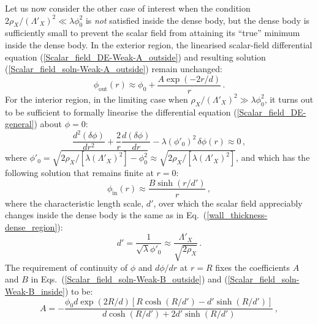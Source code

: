 \documentclass[aps,prd,onecolumn,nofootinbib]{revtex4-2} %
\begin{document}
Let us now consider the other case of interest when the condition $2 \rho_X / (\Lambda'_X)^2 \ll \lambda \phi_0^2$ is \textit{not} satisfied inside the dense body, but the dense body is sufficiently small to prevent the scalar field from attaining its ``true'' minimum inside the dense body. 
In the exterior region, the linearised scalar-field differential equation (\ref{Scalar_field_DE-Weak-A_outside}) and resulting solution (\ref{Scalar_field_soln-Weak-A_outside}) remain unchanged: 
\begin{equation}
\label{Scalar_field_soln-Weak-B_outside}
\phi_\textrm{out} (r) \approx \phi_0 + \frac{A \exp \left( -2r / d \right)}{r}  \, . 
\end{equation}
For the interior region, in the limiting case when $ \rho_X / (\Lambda'_X)^2 \gg \lambda \phi_0^2$, it turns out to be sufficient to formally linearise the differential equation (\ref{Scalar_field_DE-general}) about $\phi = 0$: 
\begin{equation}
\label{Scalar_field_DE-Weak-B_inside}
\frac{d^2 (\delta \phi)}{d r^2} + \frac{2}{r} \frac{d (\delta \phi)}{d r} - \lambda (\phi'_0)^2 \, \delta \phi (r) \approx 0  \, , 
\end{equation}
where $\phi'_0 = \sqrt{ 2 \rho_X / [\lambda ( \Lambda'_X )^2] - \phi_0^2} \approx \sqrt{ 2 \rho_X / [\lambda ( \Lambda'_X )^2]} $, and which has the following solution that remains finite at $r = 0$: 
\begin{equation}
\label{Scalar_field_soln-Weak-B_inside}
\phi_\textrm{in} (r) \approx \frac{B \sinh \left( r / d' \right)}{r}  \, , 
\end{equation}
where the characteristic length scale, $d'$, over which the scalar field appreciably changes inside the dense body is the same as in Eq.~(\ref{wall_thickness-dense_region}): 
\begin{equation}
\label{char_length_scale-Weak-B_inside}
d' = \frac{1}{\sqrt{\lambda} \phi'_0} \approx \frac{\Lambda'_X}{\sqrt{2 \rho_X}}  \, . 
\end{equation}
The requirement of continuity of $\phi$ and $d \phi / dr$ at $r=R$ fixes the coefficients $A$ and $B$ in Eqs.~(\ref{Scalar_field_soln-Weak-B_outside}) and (\ref{Scalar_field_soln-Weak-B_inside}) to be: 
\begin{equation}
\label{coeffn-A_Weak-B_inside}
A = - \frac{ \phi_0 d \exp \left( 2R/d \right) \left[ R \cosh \left( R/d' \right) - d' \sinh \left( R/d' \right) \right] }{  d \cosh \left( R/d' \right) + 2d' \sinh \left( R/d' \right)  }  \, , 
\end{equation}
\end{document}
